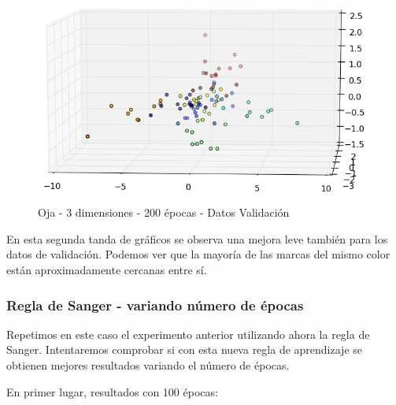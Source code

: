 \begin{figure}[h]
  \begin{center}
    \includegraphics[scale=0.65]{../img/ej1/oja/oja_3salida_200ep_validation_2.png}
  \caption{Oja - 3 dimensiones - 200 épocas - Datos Validación}
  \end{center}
\end{figure}

En esta segunda tanda de gráficos se observa una mejora leve también para los datos de validación. Podemos ver que la mayoría de las marcas del mismo color están aproximadamente cercanas entre sí.

\subsubsection{Regla de Sanger - variando número de épocas}
Repetimos en este caso el experimento anterior utilizando ahora la regla de Sanger. Intentaremos comprobar si con esta nueva regla de aprendizaje
se obtienen mejores resultados variando el número de épocas.

En primer lugar, resultados con 100 épocas:

\newpage

